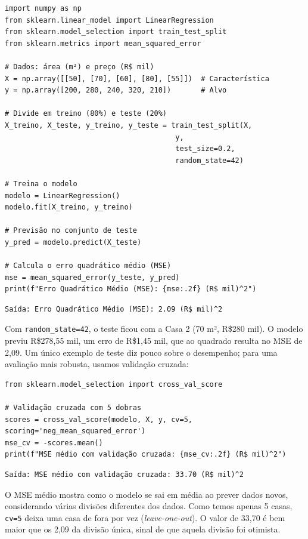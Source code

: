 \documentclass[a4paper,12pt,openany]{book}
\begin{document}
\begin{verbatim}
import numpy as np
from sklearn.linear_model import LinearRegression
from sklearn.model_selection import train_test_split
from sklearn.metrics import mean_squared_error

# Dados: área (m²) e preço (R$ mil)
X = np.array([[50], [70], [60], [80], [55]])  # Característica
y = np.array([200, 280, 240, 320, 210])       # Alvo

# Divide em treino (80%) e teste (20%)
X_treino, X_teste, y_treino, y_teste = train_test_split(X, 
                                        y, 
                                        test_size=0.2, 
                                        random_state=42)

# Treina o modelo
modelo = LinearRegression()
modelo.fit(X_treino, y_treino)

# Previsão no conjunto de teste
y_pred = modelo.predict(X_teste)

# Calcula o erro quadrático médio (MSE)
mse = mean_squared_error(y_teste, y_pred)
print(f"Erro Quadrático Médio (MSE): {mse:.2f} (R$ mil)^2")
\end{verbatim}

\begin{verbatim}
Saída: Erro Quadrático Médio (MSE): 2.09 (R$ mil)^2
\end{verbatim}

Com \texttt{random\_state=42}, o teste ficou com a Casa 2 (70 m², R\$280 mil). O modelo previu R\$278,55 mil, um erro de R\$1,45 mil, que ao quadrado resulta no MSE de 2,09. Um único exemplo de teste diz pouco sobre o desempenho; para uma avaliação mais robusta, usamos validação cruzada:

\begin{verbatim}
from sklearn.model_selection import cross_val_score

# Validação cruzada com 5 dobras
scores = cross_val_score(modelo, X, y, cv=5, scoring='neg_mean_squared_error')
mse_cv = -scores.mean()
print(f"MSE médio com validação cruzada: {mse_cv:.2f} (R$ mil)^2")
\end{verbatim}
\begin{verbatim}
Saída: MSE médio com validação cruzada: 33.70 (R$ mil)^2    
\end{verbatim}

\vspace{0,5cm}

O MSE médio mostra como o modelo se sai em média ao prever dados novos, considerando várias divisões diferentes dos dados. Como temos apenas 5 casas, \texttt{cv=5} deixa uma casa de fora por vez (\textit{leave-one-out}). O valor de 33,70 é bem maior que os 2,09 da divisão única, sinal de que aquela divisão foi otimista.
\end{document}
